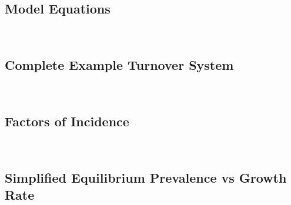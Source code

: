 \subsection{Model Equations}\label{aa:eqs-model}

\\[1em]
\subsection{Complete Example Turnover System}\label{aa:eqs-turnover}

\\[1em]
\subsection{Factors of Incidence}\label{aa:eqs-incidence}

\\[1em]
\subsection{Simplified Equilibrium Prevalence vs Growth Rate}\label{aa:eqs-growth}

